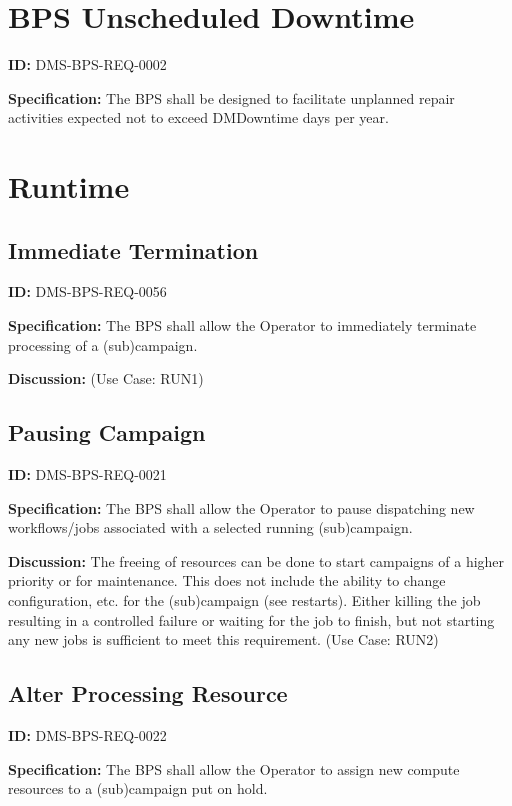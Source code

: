 \documentclass[SE,toc,lsstdraft]{lsstdoc}
\begin{document}
\section{BPS Unscheduled Downtime}

\label{DMS-BPS-REQ-0002}
\textbf{ID:} DMS-BPS-REQ-0002

\textbf{Specification:}
The BPS shall be designed to facilitate unplanned repair activities expected not to exceed DMDowntime days per year.

\section{Runtime}

\subsection{Immediate Termination}

\label{DMS-BPS-REQ-0056}
\textbf{ID:} DMS-BPS-REQ-0056

\textbf{Specification:}
The BPS shall allow the Operator to immediately terminate processing of a (sub)campaign.

\textbf{Discussion:}
(Use Case: RUN1)

\subsection{Pausing Campaign}

\label{DMS-BPS-REQ-0021}
\textbf{ID:} DMS-BPS-REQ-0021

\textbf{Specification:}
The BPS shall allow the Operator to pause dispatching new workflows/jobs associated with a selected running (sub)campaign.

\textbf{Discussion:}
The freeing of resources can be done to start campaigns of a higher priority or for maintenance. This does not include the ability to change configuration, etc. for the (sub)campaign (see restarts). Either killing the job resulting in a controlled failure or waiting for the job to finish, but not starting any new jobs is sufficient to meet this requirement.  (Use Case: RUN2)

\subsection{Alter Processing Resource}

\label{DMS-BPS-REQ-0022}
\textbf{ID:} DMS-BPS-REQ-0022

\textbf{Specification:}
The BPS shall allow the Operator to assign new compute resources to a (sub)campaign put on hold.
\end{document}
